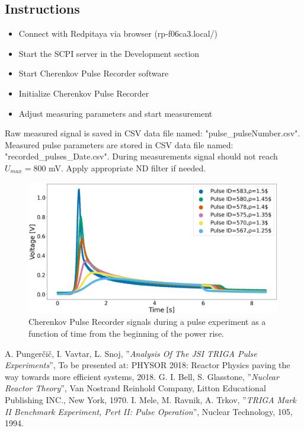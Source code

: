 \documentclass[a4paper,12pt]{article}
\begin{document}
\subsection{Instructions}

\begin{itemize}[noitemsep]
	\item Connect with Redpitaya via browser (rp-f06ca3.local/)
	\item Start the SCPI server in the Development section
	\item Start Cherenkov Pulse Recorder software
	\item Initialize Cherenkov Pulse Recorder
	\item Adjust measuring parameters and start measurement
\end{itemize}

\noindent Raw measured signal is saved in CSV data file named: "pulse\_pulseNumber.csv". Measured pulse parameters are stored in CSV data file named: "recorded\_pulses\_Date.csv". During measurements signal should not reach $U_{max}=800$ mV. Apply appropriate ND filter if needed.

\begin{figure}[ht!]
	\centering
	\includegraphics[width=0.99\textwidth]{fig4.png}
	\caption{Cherenkov Pulse Recorder signals during a pulse experiment as a function of time from the beginning of the power rise.}
	\label{Fig:f3}
\end{figure}

\begin{thebibliography}{99}
A. Punger\v ci\v c, I. Vavtar, L. Snoj, ''\textit{Analysis Of The JSI TRIGA Pulse Experiments}'', To be presented at: PHYSOR 2018: Reactor Physics paving the way towards more efficient systems, 2018.
G. I. Bell, S. Glasstone, ''\textit{Nuclear Reactor Theory}'', Van Nostrand Reinhold Company, Litton Educational Publishing INC., New York, 1970.
I. Mele, M. Ravnik, A. Trkov, ''\textit{TRIGA Mark II Benchmark Experiment, Pert II: Pulse Operation}'', Nuclear Technology, 105, 1994.
\end{thebibliography}
\end{document}
